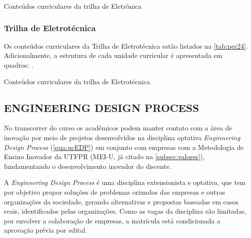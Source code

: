 \begin{table}[!htb]
	\centering\footnotesize
	\caption{Conteúdos curriculares da trilha de Eletrônica}
	\label{tab:per23}
\end{table}

\clearpage

\subsubsection{Trilha de Eletrotécnica}

Os conteúdos curriculares da Trilha de Eletrotécnica estão listados na \autoref{tab:per24}. Adicionalmente, a estrutura de cada unidade curricular é apresentada em quadros: .

\begin{table}[!htb]
	\centering\footnotesize
	\caption{Conteúdos curriculares da trilha de Eletrotécnica}
	\label{tab:per24}
\end{table}

\clearpage

\subsection{ENGINEERING DESIGN PROCESS}
\label{subsc:edp}

No transcorrer do curso os acadêmicos podem manter contato com a área de inovação por meio de projetos desenvolvidos na disciplina optativa \textit{Enginnering Design Process} (\autoref{qua:ucEDP}) em conjunto com empresas com a Metodologia de Ensino Inovador da UTFPR (MEI-U, já citado na \autoref{subsec:valores}), fundamentando o desenvolvimento inovador do discente.


A \textit{Enginnering Design Process} é uma disciplina extensionista e optativa, que tem por objetivo propor soluções de problemas oriundos das empresas e outras organizações da sociedade, gerando alternativas e propostas baseadas em casos reais, identificados pelas organizações. Como as vagas da disciplina são limitadas, por envolver a colaboração de empresas, a matrícula está condicionada a aprovação prévia por edital.



